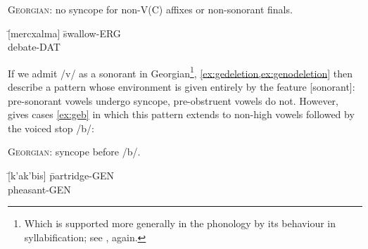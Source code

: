 
\begin{example}\label{ex:genodeletion} \textsc{Georgian}: no syncope for non-V(C) affixes or non-sonorant finals.
\begin{tabbing}
   \tab[2cm] \= [mercxalma] \tab[2cm] \= swallow-{\sc\scriptsize ERG} \\
   \> [kʼamatis] \> debate-{\sc\scriptsize DAT}
    \end{tabbing}
\end{example}

If we admit /v/ as a sonorant in Georgian\footnote{Which is supported more generally in the phonology by its behaviour in syllabification; see \cite{Butskh2001,Butskh2002}, again.}, \cref{ex:gedeletion,ex:genodeletion} then describe a pattern whose environment is given entirely by the feature [sonorant]: pre-sonorant vowels undergo syncope, pre-obstruent vowels do not. However, \citeauthor{Butskh2002} gives cases \cref{ex:geb} in which this pattern extends to non-high vowels followed by the voiced stop /b/:

\begin{example}\label{ex:geb} \textsc{Georgian}: syncope before /b/. \citep{Butskh2002}
\begin{tabbing}

         \tab[2cm] \= [k'ak'bis] \tab[2cm] \= partridge-{\sc\scriptsize GEN}\\
         \tab[2cm] \> [xoxbis] \tab[2cm] \> pheasant-{\sc\scriptsize GEN}
    \end{tabbing}
\end{example}

